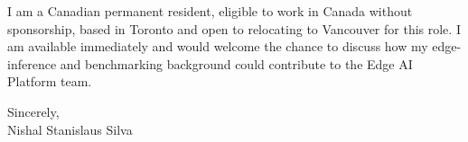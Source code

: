 \documentclass[11pt]{article}
\begin{document}
\vspace{0.5em}
\noindent I am a Canadian permanent resident, eligible to work in Canada without sponsorship, based in Toronto and open to relocating to Vancouver for this role. I am available immediately and would welcome the chance to discuss how my edge-inference and benchmarking background could contribute to the Edge AI Platform team.

\vspace{1em}
\noindent Sincerely, \\
Nishal Stanislaus Silva
\end{document}
